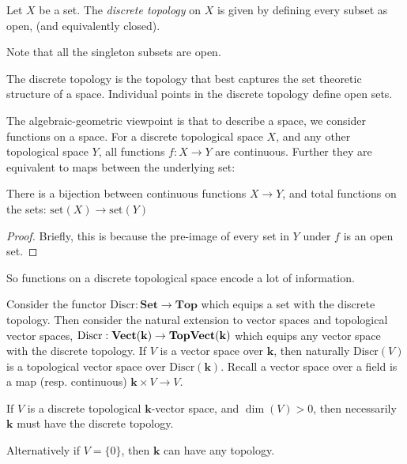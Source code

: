         
        \begin{defn}
        Let \(X\) be a set. The \emph{discrete topology} on \(X\) is given by defining every subset as open, (and equivalently closed).
        \end{defn}
        Note that all the singleton subsets are open.
        
        The discrete topology is the topology that best captures the set theoretic structure of a space. Individual points in the discrete topology define open sets.
    
        The algebraic-geometric viewpoint is that to describe a space, we consider functions on a space. For a discrete topological space \(X\), and any other topological space \(Y\), all functions \(f : X \rightarrow Y\) are continuous. Further they are equivalent to maps between the underlying set:
        
        \begin{lem}
        There is a bijection between continuous functions \(X \rightarrow Y\), and total functions on the sets: \( \mathrm{set}(X) \rightarrow \mathrm{set}(Y)\) 
        \end{lem}
        
        \begin{proof} Briefly, this is because the pre-image of every set in \(Y\) under \(f\) is an open set.
        \end{proof}
        
        So functions on a discrete topological space encode a lot of information. 

        Consider the functor \(\mathrm{Discr} : \mathbf{Set} \rightarrow \mathbf{Top}\) which equips a set with the discrete topology. Then consider the natural extension to vector spaces and topological vector spaces,
        \( \mathrm{Discr}:\mathbf{Vect}(\mathbf{k}) \rightarrow \mathbf{TopVect}(\mathbf{k}) \) which equips any vector space with the discrete topology. If \(V\) is a vector space over \(\mathbf{k}\), then naturally \(\mathrm{Discr}(V)\) is a topological vector space over \( \mathrm{Discr}(\mathbf{k})\). Recall a vector space over a field is a map (resp. continuous) \(  \mathbf{k} \times V \rightarrow V\).

        
        \begin{lem}
        If \(V\) is a discrete topological \(\mathbf{k}\)-vector space, and \(\dim(V)>0\), then necessarily \( \mathbf{k}\) must have the discrete topology. 
        
        Alternatively if \(V = \{ 0\}\), then \(\mathbf{k}\) can have any topology. 
        \end{lem} 
        
